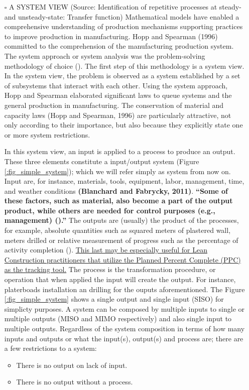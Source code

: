 \documentclass{article}
\begin{document}
\begin{itemize}
\item[{$\square$}] A SYSTEM VIEW (Source: Identification of repetitive processes at steady- and unsteady-state: Transfer function)
Mathematical models have enabled a comprehensive understanding of production mechanisms supporting practices to improve production in manufacturing.
Hopp and Spearman (1996) committed to the comprehension of the manufacturing production system.
The system approach or system analysis was the problem-solving methodology of choice (\citep{Hopp2001}).
The first step of this methodology is a system view.
In the system view, the problem is observed as a system established by a set of subsystems that interact with each other.
Using the system approach, Hopp and Spearman elaborated significant laws to queue systems and the general production in manufacturing.
The conservation of material and capacity laws (Hopp and Spearman, 1996) are particularly attractive, not only according to their importance, but also because they explicitly state one or more system restrictions.

In this system view, an input is applied to a process to produce an output.
These three elements constitute a input/output system (Figure \ref{:fig_simple_system});  which we will refer simply as system from now on.
Input are, for instance, materials, tools, equipment, labor, management, time, and weather conditions \textbf{(Blanchard and Fabrycky, 2011)}.
\textbf{``Some of these factors, such as material, also become a part of the output product, while others are needed for control purposes (e.g., management) (\citep{Remold1989}).''}
The outputs are (usually) the product of the processes, for example, absolute quantities such as squared meters of plastered wall, meters drilled or relative measurement of progress such as the percentage of activity completion (\citep{Antunes2016}).
\uline{This last may be especially useful for Lean Construction practitioners that utilize the Planned Percent Complete (PPC) as the tracking tool.}
The process is the transformation procedure, or operation that when applied the input will create the output.
For instance, platerboads installation an drilling for the ouputs aforementioned.
The Figure \ref{:fig_simple_system} shows a single output and single input (SISO) for simplicty purposes.
A system can be composed by multiple inputs to single or multiple outputs (MISO and MIMO respectively) and also single input to multiple outputs.
Regardless of the system composition in terms of how many inputs and outputs or what the input(s), output(s) and process are; there are a few restrictions to a system:
\begin{itemize}
\item There is no output on lack of input.
\item There is no output without a process.
\end{itemize}
\end{itemize}
\end{document}
